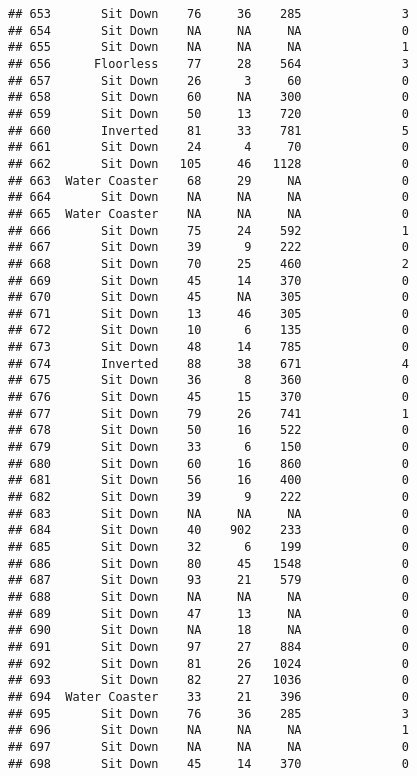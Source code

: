 \documentclass[
]{article}
\begin{document}
\begin{verbatim}
## 653       Sit Down    76     36    285              3
## 654       Sit Down    NA     NA     NA              0
## 655       Sit Down    NA     NA     NA              1
## 656      Floorless    77     28    564              3
## 657       Sit Down    26      3     60              0
## 658       Sit Down    60     NA    300              0
## 659       Sit Down    50     13    720              0
## 660       Inverted    81     33    781              5
## 661       Sit Down    24      4     70              0
## 662       Sit Down   105     46   1128              0
## 663  Water Coaster    68     29     NA              0
## 664       Sit Down    NA     NA     NA              0
## 665  Water Coaster    NA     NA     NA              0
## 666       Sit Down    75     24    592              1
## 667       Sit Down    39      9    222              0
## 668       Sit Down    70     25    460              2
## 669       Sit Down    45     14    370              0
## 670       Sit Down    45     NA    305              0
## 671       Sit Down    13     46    305              0
## 672       Sit Down    10      6    135              0
## 673       Sit Down    48     14    785              0
## 674       Inverted    88     38    671              4
## 675       Sit Down    36      8    360              0
## 676       Sit Down    45     15    370              0
## 677       Sit Down    79     26    741              1
## 678       Sit Down    50     16    522              0
## 679       Sit Down    33      6    150              0
## 680       Sit Down    60     16    860              0
## 681       Sit Down    56     16    400              0
## 682       Sit Down    39      9    222              0
## 683       Sit Down    NA     NA     NA              0
## 684       Sit Down    40    902    233              0
## 685       Sit Down    32      6    199              0
## 686       Sit Down    80     45   1548              0
## 687       Sit Down    93     21    579              0
## 688       Sit Down    NA     NA     NA              0
## 689       Sit Down    47     13     NA              0
## 690       Sit Down    NA     18     NA              0
## 691       Sit Down    97     27    884              0
## 692       Sit Down    81     26   1024              0
## 693       Sit Down    82     27   1036              0
## 694  Water Coaster    33     21    396              0
## 695       Sit Down    76     36    285              3
## 696       Sit Down    NA     NA     NA              1
## 697       Sit Down    NA     NA     NA              0
## 698       Sit Down    45     14    370              0

\end{verbatim}
\end{document}
